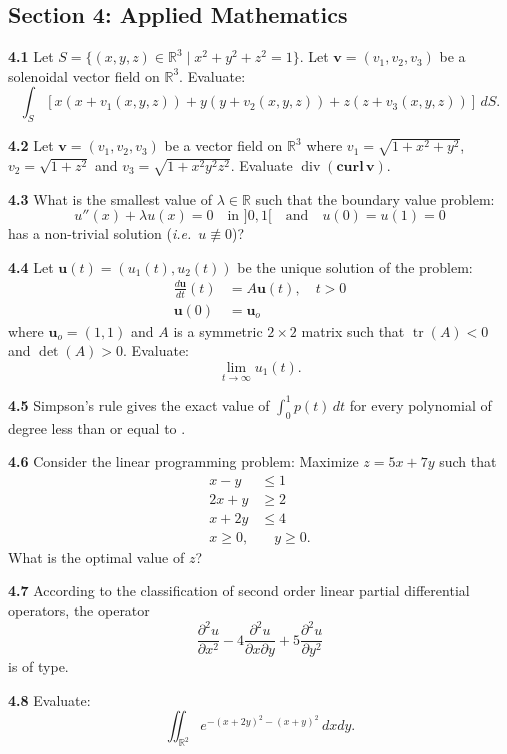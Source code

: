 \documentclass[11pt,a4paper]{article}
\newcommand{\R}{\mathbb{R}}
\newcommand{\tr}{\operatorname{tr}}
\newcommand{\divg}{\operatorname{div}}
\newcommand{\examsec}[1]{%
  \subsection*{#1}
  \vspace{-2pt}
}
\newcommand{\qitem}[1]{\par\medskip\noindent\textbf{#1}\hspace{0.5em}}
\begin{document}
\examsec{Section 4: Applied Mathematics}

\qitem{4.1} Let $S = \{(x, y, z) \in \R^3 \mid x^2 + y^2 + z^2 = 1\}$. Let $\mathbf{v} = (v_1, v_2, v_3)$ be a solenoidal vector field on $\R^3$. Evaluate:
\[
  \int_S [x(x + v_1(x, y, z)) + y(y + v_2(x, y, z)) + z(z + v_3(x, y, z))]\,dS.
\]

\qitem{4.2} Let $\mathbf{v} = (v_1, v_2, v_3)$ be a vector field on $\R^3$ where $v_1 = \sqrt{1 + x^2 + y^2}$, $v_2 = \sqrt{1 + z^2}$ and $v_3 = \sqrt{1 + x^2 y^2 z^2}$. Evaluate $\divg(\mathbf{curl}\,\mathbf{v})$.

\qitem{4.3} What is the smallest value of $\lambda \in \R$ such that the boundary value problem:
\[
  u''(x) + \lambda u(x) = 0 \quad \text{in } ]0, 1[ \quad \text{and} \quad u(0) = u(1) = 0
\]
has a non-trivial solution (\emph{i.e.}\ $u \not\equiv 0$)?

\qitem{4.4} Let $\mathbf{u}(t) = (u_1(t), u_2(t))$ be the unique solution of the problem:
\begin{align*}
  \frac{d\mathbf{u}}{dt}(t) &= A\mathbf{u}(t), \quad t > 0 \\
  \mathbf{u}(0) &= \mathbf{u}_o
\end{align*}
where $\mathbf{u}_o = (1, 1)$ and $A$ is a symmetric $2 \times 2$ matrix such that $\tr(A) < 0$ and $\det(A) > 0$. Evaluate:
\[
  \lim_{t \to \infty} u_1(t).
\]

\qitem{4.5} Simpson's rule gives the exact value of $\int_0^1 p(t)\,dt$ for every polynomial of degree less than or equal to \underline{\hspace{2cm}}.

\qitem{4.6} Consider the linear programming problem: Maximize $z = 5x + 7y$ such that
\begin{align*}
  x - y &\le 1 \\
  2x + y &\ge 2 \\
  x + 2y &\le 4 \\
  x \ge 0,&\quad y \ge 0.
\end{align*}
What is the optimal value of $z$?

\qitem{4.7} According to the classification of second order linear partial differential operators, the operator
\[
  \frac{\partial^2 u}{\partial x^2} - 4\frac{\partial^2 u}{\partial x \partial y} + 5\frac{\partial^2 u}{\partial y^2}
\]
is of \underline{\hspace{2cm}} type.

\qitem{4.8} Evaluate:
\[
  \iint_{\R^2} e^{-(x+2y)^2 - (x+y)^2}\,dxdy.
\]
\end{document}
